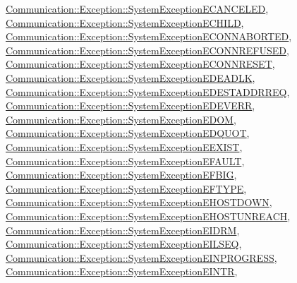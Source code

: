 \hyperlink{class_communication_1_1_exception_1_1_system_exception_e_c_a_n_c_e_l_e_d}{Communication\+::\+Exception\+::\+System\+Exception\+E\+C\+A\+N\+C\+E\+L\+E\+D}, \hyperlink{class_communication_1_1_exception_1_1_system_exception_e_c_h_i_l_d}{Communication\+::\+Exception\+::\+System\+Exception\+E\+C\+H\+I\+L\+D}, \hyperlink{class_communication_1_1_exception_1_1_system_exception_e_c_o_n_n_a_b_o_r_t_e_d}{Communication\+::\+Exception\+::\+System\+Exception\+E\+C\+O\+N\+N\+A\+B\+O\+R\+T\+E\+D}, \hyperlink{class_communication_1_1_exception_1_1_system_exception_e_c_o_n_n_r_e_f_u_s_e_d}{Communication\+::\+Exception\+::\+System\+Exception\+E\+C\+O\+N\+N\+R\+E\+F\+U\+S\+E\+D}, \hyperlink{class_communication_1_1_exception_1_1_system_exception_e_c_o_n_n_r_e_s_e_t}{Communication\+::\+Exception\+::\+System\+Exception\+E\+C\+O\+N\+N\+R\+E\+S\+E\+T}, \hyperlink{class_communication_1_1_exception_1_1_system_exception_e_d_e_a_d_l_k}{Communication\+::\+Exception\+::\+System\+Exception\+E\+D\+E\+A\+D\+L\+K}, \hyperlink{class_communication_1_1_exception_1_1_system_exception_e_d_e_s_t_a_d_d_r_r_e_q}{Communication\+::\+Exception\+::\+System\+Exception\+E\+D\+E\+S\+T\+A\+D\+D\+R\+R\+E\+Q}, \hyperlink{class_communication_1_1_exception_1_1_system_exception_e_d_e_v_e_r_r}{Communication\+::\+Exception\+::\+System\+Exception\+E\+D\+E\+V\+E\+R\+R}, \hyperlink{class_communication_1_1_exception_1_1_system_exception_e_d_o_m}{Communication\+::\+Exception\+::\+System\+Exception\+E\+D\+O\+M}, \hyperlink{class_communication_1_1_exception_1_1_system_exception_e_d_q_u_o_t}{Communication\+::\+Exception\+::\+System\+Exception\+E\+D\+Q\+U\+O\+T}, \hyperlink{class_communication_1_1_exception_1_1_system_exception_e_e_x_i_s_t}{Communication\+::\+Exception\+::\+System\+Exception\+E\+E\+X\+I\+S\+T}, \hyperlink{class_communication_1_1_exception_1_1_system_exception_e_f_a_u_l_t}{Communication\+::\+Exception\+::\+System\+Exception\+E\+F\+A\+U\+L\+T}, \hyperlink{class_communication_1_1_exception_1_1_system_exception_e_f_b_i_g}{Communication\+::\+Exception\+::\+System\+Exception\+E\+F\+B\+I\+G}, \hyperlink{class_communication_1_1_exception_1_1_system_exception_e_f_t_y_p_e}{Communication\+::\+Exception\+::\+System\+Exception\+E\+F\+T\+Y\+P\+E}, \hyperlink{class_communication_1_1_exception_1_1_system_exception_e_h_o_s_t_d_o_w_n}{Communication\+::\+Exception\+::\+System\+Exception\+E\+H\+O\+S\+T\+D\+O\+W\+N}, \hyperlink{class_communication_1_1_exception_1_1_system_exception_e_h_o_s_t_u_n_r_e_a_c_h}{Communication\+::\+Exception\+::\+System\+Exception\+E\+H\+O\+S\+T\+U\+N\+R\+E\+A\+C\+H}, \hyperlink{class_communication_1_1_exception_1_1_system_exception_e_i_d_r_m}{Communication\+::\+Exception\+::\+System\+Exception\+E\+I\+D\+R\+M}, \hyperlink{class_communication_1_1_exception_1_1_system_exception_e_i_l_s_e_q}{Communication\+::\+Exception\+::\+System\+Exception\+E\+I\+L\+S\+E\+Q}, \hyperlink{class_communication_1_1_exception_1_1_system_exception_e_i_n_p_r_o_g_r_e_s_s}{Communication\+::\+Exception\+::\+System\+Exception\+E\+I\+N\+P\+R\+O\+G\+R\+E\+S\+S}, \hyperlink{class_communication_1_1_exception_1_1_system_exception_e_i_n_t_r}{Communication\+::\+Exception\+::\+System\+Exception\+E\+I\+N\+T\+R}, 
